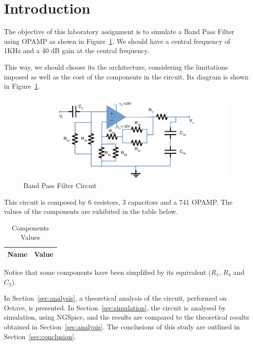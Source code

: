 \section{Introduction}
\label{sec:introduction}
The objective of this laboratory assignment is to simulate a Band Pass Filter using OPAMP as shown in Figure~\ref{fig:circuit}.
We should have a central frequency of 1KHz and a 40 dB gain at the central frequency. 

This way, we should choose its the architecture, considering the limitations imposed as well as the cost of the components in the circuit.
Its diagram is shown in Figure~\ref{fig:circuit}.
\begin{figure}[H] \centering
\includegraphics[width=0.8\linewidth]{circuit.pdf}
\caption{Band Pass Filter Circuit}                                     
\label{fig:circuit}
\end{figure}
This circuit is composed by 6 resistors, 3 capacitors and a 741 OPAMP.
The values of the components are exhibited in the table below.
\begin{table}[H]
  \centering
  \begin{tabular}{|l|r|}
     \hline    
    {\bf Name} & {\bf Value} \\ \hline   
    
  \end{tabular}
  \caption{Components Values}
  \label{tab:datags}
\end{table}
Notice that some components have been simplified by its equivalent ($R_1$, $R_4$ and $C_2$).

In Section~\ref{sec:analysis}, a theoretical analysis of the circuit, 
performed on Octave, is presented. In Section~\ref{sec:simulation}, the 
circuit is analysed by simulation, using NGSpice, and the results are compared to 
the theoretical results obtained in Section~\ref{sec:analysis}. The conclusions 
of this study are outlined in Section~\ref{sec:conclusion}.

